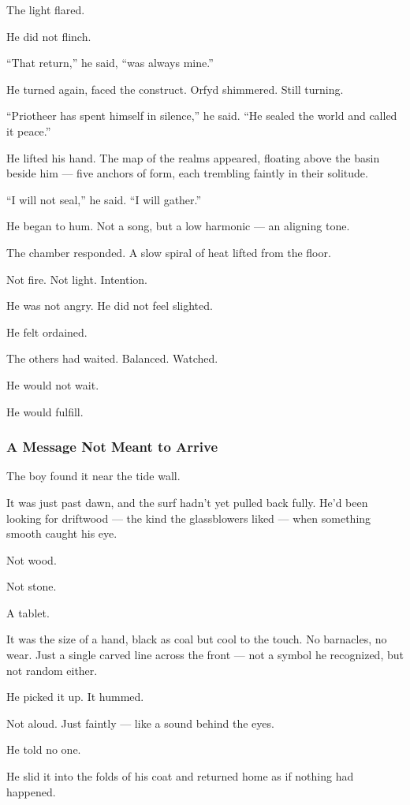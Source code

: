 \documentclass[12pt]{article}
\begin{document}
The light flared.

He did not flinch.

``That return,'' he said, ``was always mine.''

He turned again, faced the construct. Orfyd shimmered. Still turning.

``Priotheer has spent himself in silence,'' he said. ``He sealed the world and called it peace.''

He lifted his hand. The map of the realms appeared, floating above the basin beside him — five anchors of form, each trembling faintly in their solitude.

``I will not seal,'' he said. ``I will gather.''

He began to hum. Not a song, but a low harmonic — an aligning tone.

The chamber responded. A slow spiral of heat lifted from the floor.

Not fire. Not light. Intention.

He was not angry. He did not feel slighted.

He felt ordained.

The others had waited. Balanced. Watched.

He would not wait.

He would fulfill.


\dotfill

\subsubsection{A Message Not Meant to Arrive}

The boy found it near the tide wall.

It was just past dawn, and the surf hadn’t yet pulled back fully. He’d been looking for driftwood — the kind the glassblowers liked — when something smooth caught his eye.

Not wood.

Not stone.

A tablet.

It was the size of a hand, black as coal but cool to the touch. No barnacles, no wear. Just a single carved line across the front — not a symbol he recognized, but not random either.

He picked it up. It hummed.

Not aloud. Just faintly — like a sound behind the eyes.

He told no one.

He slid it into the folds of his coat and returned home as if nothing had happened.
\end{document}

